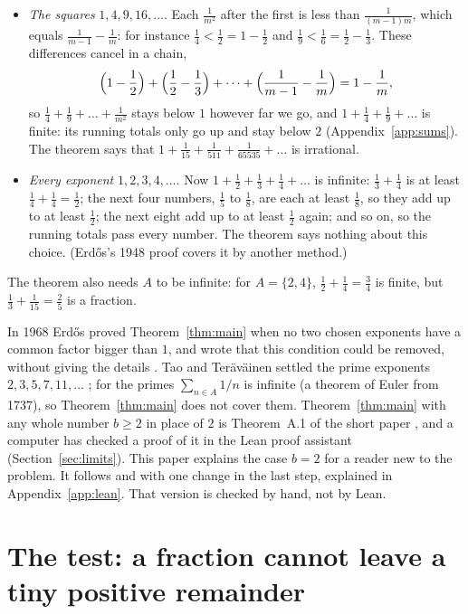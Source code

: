 \documentclass[10pt]{article}
\theoremstyle{plain}
\theoremstyle{definition}
\theoremstyle{remark}
\begin{document}
\begin{itemize}
\item \emph{The squares} $1,4,9,16,\dots$. Each $\tfrac1{m^2}$ after the first
 is less than $\tfrac1{(m-1)m}$, which equals $\tfrac1{m-1}-\tfrac1m$: for
 instance $\tfrac14<\tfrac12=1-\tfrac12$ and $\tfrac19<\tfrac16=\tfrac12-\tfrac13$.
 These differences cancel in a chain,
 \[
  \Bigl(1-\frac12\Bigr)+\Bigl(\frac12-\frac13\Bigr)+\dots+\Bigl(\frac1{m-1}-\frac1m\Bigr)=1-\frac1m ,
 \]
 so $\tfrac14+\tfrac19+\dots+\tfrac1{m^2}$ stays below $1$ however far we
 go, and $1+\tfrac14+\tfrac19+\dots$ is finite: its running totals only go up
 and stay below $2$ (Appendix~\ref{app:sums}). The theorem says that
 $1+\tfrac1{15}+\tfrac1{511}+\tfrac1{65535}+\dots$ is irrational.
\item \emph{Every exponent} $1,2,3,4,\dots$. Now $1+\tfrac12+\tfrac13+\tfrac14+\dots$
 is infinite: $\tfrac13+\tfrac14$ is at least $\tfrac14+\tfrac14=\tfrac12$;
 the next four numbers, $\tfrac15$ to $\tfrac18$, are each at least $\tfrac18$,
 so they add up to at least $\tfrac12$; the next eight add up to at least
 $\tfrac12$ again; and so on, so the running totals pass every number. The
 theorem says nothing about this choice. (Erd\H{o}s's 1948 proof covers it by
 another method.)
\end{itemize}
The theorem also needs $A$ to be infinite: for $A=\{2,4\}$,
$\tfrac12+\tfrac14=\tfrac34$ is finite, but $\tfrac13+\tfrac1{15}=\tfrac25$ is
a fraction.

In 1968 Erd\H{o}s proved Theorem~\ref{thm:main} when no two chosen exponents
have a common factor bigger than $1$, and wrote that this condition could be
removed, without giving the details \cite[p.~222]{erdos1968}. Tao and
Ter\"av\"ainen settled the prime exponents $2,3,5,7,11,\dots$
\cite[Theorem~1.3]{taoteravainen2025}; for the primes $\sum_{n\in A}1/n$ is
infinite (a theorem of Euler from 1737), so Theorem~\ref{thm:main} does not
cover them. Theorem~\ref{thm:main}
with any whole number $b\ge2$ in place of $2$ is Theorem~A.1 of the short
paper \cite{shortpaper}, and a computer has checked a proof of it in the Lean
proof assistant (Section~\ref{sec:limits}). This paper explains the case
$b=2$ for a reader new to the problem. It follows
\cite[Appendix~A]{shortpaper} and \cite[Section~1.1]{longrecord} with one
change in the last step, explained in Appendix~\ref{app:lean}. That version is
checked by hand, not by Lean.

\section{The test: a fraction cannot leave a tiny positive remainder}\label{sec:test}
\end{document}
